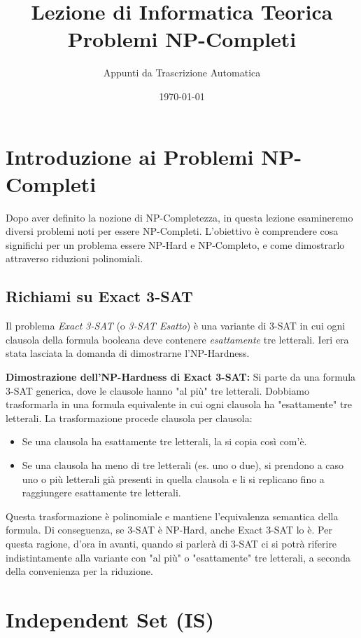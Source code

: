 \documentclass[a4paper]{article}
\title{Lezione di Informatica Teorica \\ \Large Problemi NP-Completi}
\author{Appunti da Trascrizione Automatica}
\date{\today}
\theoremstyle{definition} %
\begin{document}
\maketitle
\tableofcontents
\newpage

\section{Introduzione ai Problemi NP-Completi}

Dopo aver definito la nozione di NP-Completezza, in questa lezione esamineremo diversi problemi noti per essere NP-Completi. L'obiettivo è comprendere cosa significhi per un problema essere NP-Hard e NP-Completo, e come dimostrarlo attraverso riduzioni polinomiali.

\subsection{Richiami su Exact 3-SAT}

Il problema \emph{Exact 3-SAT} (o \emph{3-SAT Esatto}) è una variante di 3-SAT in cui ogni clausola della formula booleana deve contenere \emph{esattamente} tre letterali. Ieri era stata lasciata la domanda di dimostrarne l'NP-Hardness.

\textbf{Dimostrazione dell'NP-Hardness di Exact 3-SAT:}
Si parte da una formula 3-SAT generica, dove le clausole hanno "al più" tre letterali. Dobbiamo trasformarla in una formula equivalente in cui ogni clausola ha "esattamente" tre letterali.
La trasformazione procede clausola per clausola:
\begin{itemize}
    \item Se una clausola ha esattamente tre letterali, la si copia così com'è.
    \item Se una clausola ha meno di tre letterali (es. uno o due), si prendono a caso uno o più letterali già presenti in quella clausola e li si replicano fino a raggiungere esattamente tre letterali.
\end{itemize}
Questa trasformazione è polinomiale e mantiene l'equivalenza semantica della formula. Di conseguenza, se 3-SAT è NP-Hard, anche Exact 3-SAT lo è. Per questa ragione, d'ora in avanti, quando si parlerà di 3-SAT ci si potrà riferire indistintamente alla variante con "al più" o "esattamente" tre letterali, a seconda della convenienza per la riduzione.

\section{Independent Set (IS)}
\end{document}
